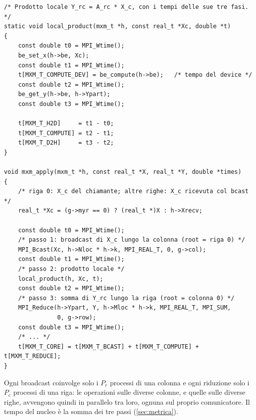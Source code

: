 \documentclass[11pt,a4paper]{article}
\begin{document}
\begin{lstlisting}[caption={I tre passi di un'invocazione del nucleo (\texttt{mxm.c}, modalità a turni omessa).}, label={lst:tre-passi}]
/* Prodotto locale Y_rc = A_rc * X_c, con i tempi delle sue tre fasi. */
static void local_product(mxm_t *h, const real_t *Xc, double *t)
{
    const double t0 = MPI_Wtime();
    be_set_x(h->be, Xc);
    const double t1 = MPI_Wtime();
    t[MXM_T_COMPUTE_DEV] = be_compute(h->be);   /* tempo del device */
    const double t2 = MPI_Wtime();
    be_get_y(h->be, h->Ypart);
    const double t3 = MPI_Wtime();

    t[MXM_T_H2D]     = t1 - t0;
    t[MXM_T_COMPUTE] = t2 - t1;
    t[MXM_T_D2H]     = t3 - t2;
}

void mxm_apply(mxm_t *h, const real_t *X, real_t *Y, double *times)
{
    /* riga 0: X_c del chiamante; altre righe: X_c ricevuta col bcast */
    real_t *Xc = (g->myr == 0) ? (real_t *)X : h->Xrecv;

    const double t0 = MPI_Wtime();
    /* passo 1: broadcast di X_c lungo la colonna (root = riga 0) */
    MPI_Bcast(Xc, h->Nloc * h->k, MPI_REAL_T, 0, g->col);
    const double t1 = MPI_Wtime();
    /* passo 2: prodotto locale */
    local_product(h, Xc, t);
    const double t2 = MPI_Wtime();
    /* passo 3: somma di Y_rc lungo la riga (root = colonna 0) */
    MPI_Reduce(h->Ypart, Y, h->Mloc * h->k, MPI_REAL_T, MPI_SUM,
               0, g->row);
    const double t3 = MPI_Wtime();
    /* ... */
    t[MXM_T_CORE] = t[MXM_T_BCAST] + t[MXM_T_COMPUTE] + t[MXM_T_REDUCE];
}
\end{lstlisting}

Ogni broadcast coinvolge solo i $P_r$ processi di una colonna e ogni riduzione
solo i $P_c$ processi di una riga: le operazioni sulle diverse colonne, e
quelle sulle diverse righe, avvengono quindi in parallelo tra loro, ognuna sul
proprio comunicatore. Il tempo del nucleo è la somma dei tre passi
(\cref{sec:metrica}).
\end{document}
